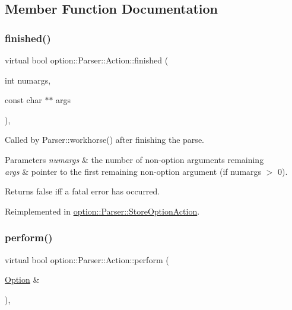 \subsection{Member Function Documentation}
\mbox{\label{structoption_1_1_parser_1_1_action_a3ec558b51e34d33d116f14587289e032}} 
\subsubsection{\texorpdfstring{finished()}{finished()}}
{\footnotesize\ttfamily virtual bool option\+::\+Parser\+::\+Action\+::finished (\begin{DoxyParamCaption}\item[{int}]{numargs,  }\item[{const char $\ast$$\ast$}]{args }\end{DoxyParamCaption})\hspace{0.3cm}{\ttfamily [inline]}, {\ttfamily [virtual]}}



Called by Parser\+::workhorse() after finishing the parse. 


\begin{DoxyParams}{Parameters}
{\em numargs} & the number of non-\/option arguments remaining \\
\hline
{\em args} & pointer to the first remaining non-\/option argument (if numargs $>$ 0).\\
\hline
\end{DoxyParams}
\begin{DoxyReturn}{Returns}
{\ttfamily false} iff a fatal error has occurred. 
\end{DoxyReturn}


Reimplemented in \hyperlink{classoption_1_1_parser_1_1_store_option_action_a617f675ef50a72ae36ce91f065bc8441}{option\+::\+Parser\+::\+Store\+Option\+Action}.

\mbox{\label{structoption_1_1_parser_1_1_action_a176b5f783bb35eb015b6d2c09422457d}} 
\subsubsection{\texorpdfstring{perform()}{perform()}}
{\footnotesize\ttfamily virtual bool option\+::\+Parser\+::\+Action\+::perform (\begin{DoxyParamCaption}\item[{\hyperlink{classoption_1_1_option}{Option} \&}]{ }\end{DoxyParamCaption})\hspace{0.3cm}{\ttfamily [inline]}, {\ttfamily [virtual]}}



